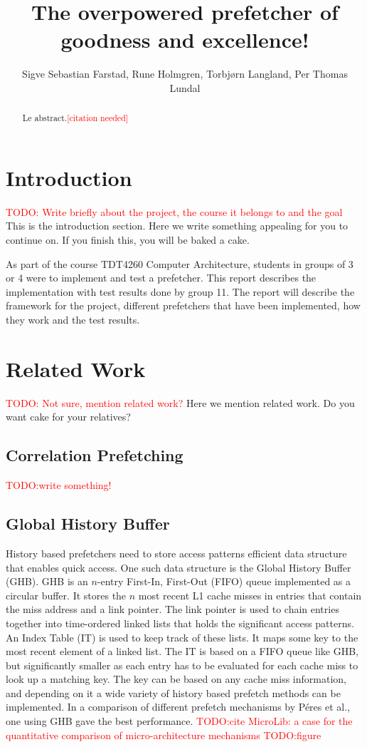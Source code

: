 \documentclass[a4paper]{IEEEtran}
\title{The overpowered prefetcher of goodness and excellence!}
\author{
    Sigve Sebastian Farstad,
    Rune Holmgren,
    Torbjørn Langland,
    Per Thomas Lundal
}
\newcommand\TODO[1]{\textcolor{red}{TODO:#1}}
\newcommand\todo[1]{\TODO{#1}}
\newcommand\cn{\textcolor{red}{[citation needed]}}
\begin{document}
\maketitle

\begin{abstract}
    Le abstract.\cn
\end{abstract}

\section{Introduction}

\todo{ Write briefly about the project, the course it belongs to and the goal}
This is the introduction section.
Here we write something appealing for you to continue on.
If you finish this, you will be baked a cake.

As part of the course TDT4260 Computer Architecture, students in groups of 3 or 4 were to implement and test a prefetcher.
This report describes the implementation with test results done by group 11.
The report will describe the framework for the project, different prefetchers that have been implemented, how they work and the test results.

\section{Related Work}

\todo{ Not sure, mention related work?}
Here we mention related work. Do you want cake for your relatives?

\subsection{Correlation Prefetching}
\todo{write something!}

\subsection{Global History Buffer}
History based prefetchers need to store access patterns efficient data structure that enables quick access.
One such data structure is the Global History Buffer (GHB).
GHB is an $n$-entry First-In, First-Out (FIFO) queue implemented as a circular buffer.
It stores the $n$ most recent L1 cache misses in entries that contain the miss address and a link pointer.
The link pointer is used to chain entries together into time-ordered linked lists that holds the significant access patterns.
An Index Table (IT) is used to keep track of these lists.
It maps some key to the most recent element of a linked list.
The IT is based on a FIFO queue like GHB, but significantly smaller as each entry has to be evaluated for each cache miss to look up a matching key.
The key can be based on any cache miss information, and depending on it a wide variety of history based prefetch methods can be implemented.
In a comparison of different prefetch mechanisms by Péres et al., one using GHB gave the best performance.
\todo{cite MicroLib: a case for the quantitative comparison of micro-architecture mechanisms}
\todo{figure}
\end{document}

